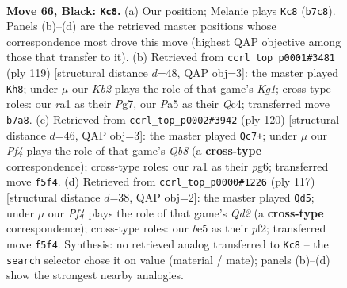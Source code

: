 \documentclass[11pt]{article}
\begin{document}
\clearpage

\begin{figure}[p]\centering
\begin{subfigure}{0.46\textwidth}\centering
\resizebox{\linewidth}{!}{%
\newchessgame
\chessboard[
  setfen={8/1k6/8/p3Bp2/P2Q4/8/8/RN4K1 b - - 0 66},
  showmover=false,
  pgfstyle=straightmove, color=movearrow, markmove={b7-c8}
]}
\caption{}
\end{subfigure}\hfill
\begin{subfigure}{0.46\textwidth}\centering
\resizebox{\linewidth}{!}{%
\newchessgame
\chessboard[
  setfen={6k1/6p1/7p/P4Q2/2q5/7P/5K2/8 b - - 3 60},
  showmover=false,
  pgfstyle=straightmove, color=movearrow, markmove={g8-h8}
]}
\caption{}
\end{subfigure}
\\[4pt]
\begin{subfigure}{0.46\textwidth}\centering
\resizebox{\linewidth}{!}{%
\newchessgame
\chessboard[
  setfen={1Q6/5k2/6p1/5q1p/2K4P/8/8/8 w - - 19 61},
  showmover=false,
  pgfstyle=straightmove, color=movearrow, markmove={b8-c7}
]}
\caption{}
\end{subfigure}\hfill
\begin{subfigure}{0.46\textwidth}\centering
\resizebox{\linewidth}{!}{%
\newchessgame
\chessboard[
  setfen={6k1/3q4/6p1/6P1/5Q2/8/5P1K/8 b - - 0 59},
  showmover=false,
  pgfstyle=straightmove, color=movearrow, markmove={d7-d5}
]}
\caption{}
\end{subfigure}
\caption{\textbf{Move 66, Black: \texttt{Kc8}.} (a) Our position; Melanie plays \texttt{Kc8} (\texttt{b7c8}). Panels (b)--(d) are the retrieved master positions whose correspondence most drove this move (highest QAP objective among those that transfer to it). (b) Retrieved from \texttt{ccrl\_top\_p0001\#3481} (ply 119) [structural distance $d$=48, QAP obj=3]: the master played \texttt{Kh8}; under $\mu$ our \emph{Kb2} plays the role of that game's \emph{Kg1}; cross-type roles: our \emph{r}a1 as their \emph{P}g7, our \emph{P}a5 as their \emph{Q}c4; transferred move \texttt{b7a8}. (c) Retrieved from \texttt{ccrl\_top\_p0002\#3942} (ply 120) [structural distance $d$=46, QAP obj=3]: the master played \texttt{Qc7+}; under $\mu$ our \emph{Pf4} plays the role of that game's \emph{Qb8} (a \textbf{cross-type} correspondence); cross-type roles: our \emph{r}a1 as their \emph{p}g6; transferred move \texttt{f5f4}. (d) Retrieved from \texttt{ccrl\_top\_p0000\#1226} (ply 117) [structural distance $d$=38, QAP obj=2]: the master played \texttt{Qd5}; under $\mu$ our \emph{Pf4} plays the role of that game's \emph{Qd2} (a \textbf{cross-type} correspondence); cross-type roles: our \emph{b}e5 as their \emph{p}f2; transferred move \texttt{f5f4}. Synthesis: no retrieved analog transferred to \texttt{Kc8} -- the \texttt{search} selector chose it on value (material / mate); panels (b)--(d) show the strongest nearby analogies.}
\label{fig:thought-m131}
\end{figure}
\end{document}
